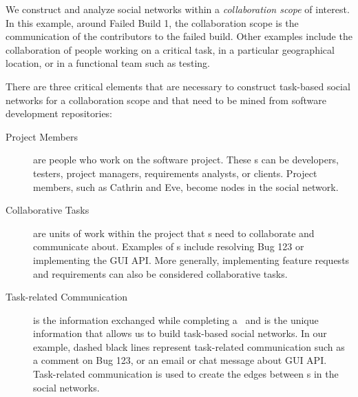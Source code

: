 We construct and analyze social networks within a \emph{collaboration scope} of
interest. In this example, around Failed Build 1, the collaboration scope is the
communication of the contributors to the failed build. Other examples include the
collaboration of people working on a critical task, in a particular geographical
location, or in a functional team such as testing.

There are three critical elements that are necessary to construct task-based
social networks for a collaboration scope and that need to be mined from software
development repositories:

\begin{description}
\item[Project Members] are people who work on the software project. These
\people s can be developers, testers, project managers, requirements analysts,
or clients. Project members, such as Cathrin and Eve, become nodes in the
social network.

\item[Collaborative Tasks] are units of work within the project that \people s
need to collaborate and communicate about. Examples of \cu s include resolving
Bug  123 or implementing the GUI API. More generally, implementing feature
requests and requirements can also be considered collaborative tasks.

\item[Task-related Communication] is the information exchanged while completing
a \cu\ and is the unique information that allows us to build task-based social
networks. In our example, dashed black lines represent task-related communication
such as a comment on Bug 123, or an email or chat message about GUI API.
Task-related communication is used to create the edges between \people s in the
social networks.
\end{description}


